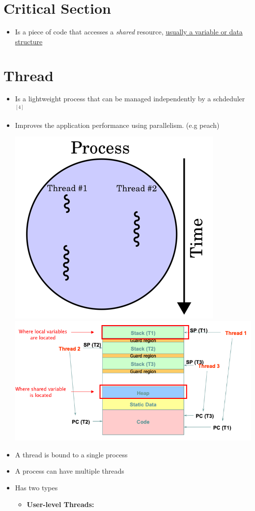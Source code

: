 \documentclass[12pt]{article}
\begin{document}
\section{Critical Section}

\begin{itemize}
    \item Is a piece of code that accesses a \textit{shared} resource,
    \ul{usually a variable or data structure}
\end{itemize}

\section{Thread}

\begin{itemize}
    \item Is a lightweight process that can be managed independently by a schdeduler $^{[4]}$
    \item Improves the application performance using parallelism. (e.g peach)

    \begin{center}
    \includegraphics[width=0.4\linewidth]{images/midterm_2_solution_1.png}
    \includegraphics[width=\linewidth]{images/midterm_2_solution_2.png}
    \end{center}

    \item A thread is bound to a single process
    \item A process can have multiple threads
    \item Has two types
    \begin{itemize}
        \item \textbf{User-level Threads:}


\end{itemize}
\end{itemize}
\end{document}
